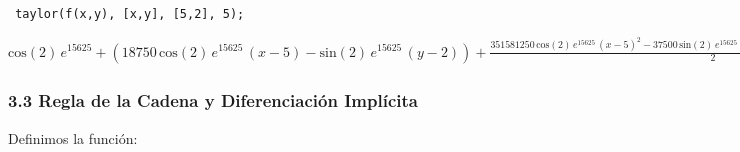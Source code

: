 \documentclass[12pt]{article}
\begin{document}
\noindent

\begin{verbatim}
 taylor(f(x,y), [x,y], [5,2], 5);
\end{verbatim}
\begin{math}
\mathrm{cos}\left( 2\right) \,{e}^{15625}+\left( 18750\,\mathrm{cos}\left( 2\right) \,{e}^{15625}\,\left( x-5\right) -\mathrm{sin}\left( 2\right) \,{e}^{15625}\,\left( y-2\right) \right) +\frac{351581250\,\mathrm{cos}\left( 2\right) \,{e}^{15625}\,{\left( x-5\right) }^{2}-37500\,\mathrm{sin}\left( 2\right) \,{e}^{15625}\,\left( y-2\right) \,\left( x-5\right) -\mathrm{cos}\left( 2\right) \,{e}^{15625}\,{\left( y-2\right) }^{2}}{2}+(6592851577500\,\mathrm{cos}\left( 2\right) \,{e}^{15625}\,{\left( x-5\right) }^{3}-1054743750\,\mathrm{sin}\left( 2\right) \,{e}^{15625}\,\left( y-2\right) \,{\left( x-5\right) }^{2}-56250\,\mathrm{cos}\left( 2\right) \,{e}^{15625}\,{\left( y-2\right) }^{2}\,\left( x-5\right) +\mathrm{sin}\left( 2\right) \,{e}^{15625}\,{\left( y-2\right) }^{3})/\,6\,+(123635744367196500\,\mathrm{cos}\left( 2\right) \,{e}^{15625}\,{\left( x-5\right) }^{4}-26371406310000\,\mathrm{sin}\left( 2\right) \,{e}^{15625}\,\left( y-2\right) \,{\left( x-5\right) }^{3}-2109487500\,\mathrm{cos}\left( 2\right) \,{e}^{15625}\,{\left( y-2\right) }^{2}\,{\left( x-5\right) }^{2}+75000\,\mathrm{sin}\left( 2\right) \,{e}^{15625}\,{\left( y-2\right) }^{3}\,\left( x-5\right) +\mathrm{cos}\left( 2\right) \,{e}^{15625}\,{\left( y-2\right) }^{4})/\,24\,+(2318664702396234378600\,\mathrm{cos}\left( 2\right) \,{e}^{15625}\,{\left( x-5\right) }^{5}-618178721835982500\,\mathrm{sin}\left( 2\right) \,{e}^{15625}\,\left( y-2\right) \,{\left( x-5\right) }^{4}-65928515775000\,\mathrm{cos}\left( 2\right) \,{e}^{15625}\,{\left( y-2\right) }^{2}\,{\left( x-5\right) }^{3}+3515812500\,\mathrm{sin}\left( 2\right) \,{e}^{15625}\,{\left( y-2\right) }^{3}\,{\left( x-5\right) }^{2}+93750\,\mathrm{cos}\left( 2\right) \,{e}^{15625}\,{\left( y-2\right) }^{4}\,\left( x-5\right) -\mathrm{sin}\left( 2\right) \,{e}^{15625}\,{\left( y-2\right) }^{5})/\,120\,+...
\end{math}

\subsubsection*{3.3 Regla de la Cadena y Diferenciación Implícita}

Definimos la función:

\noindent
\end{document}
